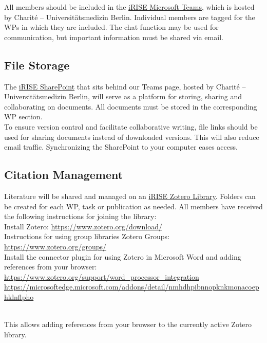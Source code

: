 \documentclass[
]{article}
\begin{document}
All members should be included in the \href{https://teams.microsoft.com/l/team/19\%3aBeyH-eKopgikP84hU4FuJggrTXugFiipnYUq8krUnAE1\%40thread.tacv2/conversations?groupId=63cd0d10-aa1b-4db9-9bb0-ed23b58ec69b\&tenantId=afe91939-923e-432c-bc66-cbc3ec18d02c}{iRISE Microsoft Teams}, which is hosted by Charité -- Universitätsmedizin Berlin. Individual members are tagged for the WPs in which they are included. The chat function may be used for communication, but important information must be shared via email.

\hypertarget{file-storage}{%
\subsection{File Storage}\label{file-storage}}

The \href{https://charitede.sharepoint.com/sites/iRISE/Shared\%20Documents/Forms/AllItems.aspx}{iRISE SharePoint} that sits behind our Teams page, hosted by Charité -- Universitätsmedizin Berlin, will serve as a platform for storing, sharing and collaborating on documents. All documents must be stored in the corresponding WP section.\\
To ensure version control and facilitate collaborative writing, file links should be used for sharing documents instead of downloaded versions. This will also reduce email traffic. Synchronizing the SharePoint to your computer eases access.

\hypertarget{citation-management}{%
\subsection{Citation Management}\label{citation-management}}

Literature will be shared and managed on an \href{https://www.zotero.org/groups/5148075/irise_library}{iRISE Zotero Library}. Folders can be created for each WP, task or publication as needed. All members have received the following instructions for joining the library:\\
Install Zotero: \url{https://www.zotero.org/download/}\\
Instructions for using group libraries Zotero \textbar{} Groups: \url{https://www.zotero.org/groups/}\\
Install the connector plugin for using Zotero in Microsoft Word and adding references from your browser:\\
\url{https://www.zotero.org/support/word_processor_integration} \url{https://microsoftedge.microsoft.com/addons/detail/nmhdhpibnnopknkmonacoephklnflpho}\strut \\
This allows adding references from your browser to the currently active Zotero library.
\end{document}
